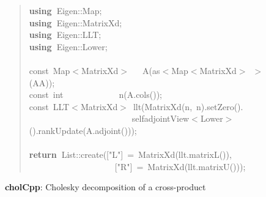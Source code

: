 \documentclass[shortnames,article]{jss}
\newcommand{\hlstd}[1]{\textcolor[rgb]{0,0,0}{#1}}
\newcommand{\hlopt}[1]{\textcolor[rgb]{0,0,0}{#1}}
\newcommand{\hlstr}[1]{\textcolor[rgb]{0.90,0.15,0.15}{#1}}
\newcommand{\hlkwa}[1]{\textcolor[rgb]{0.61,0.13,0.93}{\bf{#1}}}
\newcommand{\hlkwb}[1]{\textcolor[rgb]{0.13,0.54,0.13}{#1}}
\newcommand{\hlkwd}[1]{\textcolor[rgb]{0,0,0}{#1}}
\begin{document}
\begin{figure}[htb]
  \begin{quote}
    \noindent
    \ttfamily
    \hlstd{}\hlkwa{using\ }\hlstd{Eigen}\hlopt{::}\hlstd{Map}\hlopt{;}\hspace*{\fill}\\
    \hlstd{}\hlkwa{using\ }\hlstd{Eigen}\hlopt{::}\hlstd{MatrixXd}\hlopt{;}\hspace*{\fill}\\
    \hlstd{}\hlkwa{using\ }\hlstd{Eigen}\hlopt{::}\hlstd{LLT}\hlopt{;}\hspace*{\fill}\\
    \hlstd{}\hlkwa{using\ }\hlstd{Eigen}\hlopt{::}\hlstd{Lower}\hlopt{;}\hspace*{\fill}\\
    \hlstd{}\hspace*{\fill}\\
    \hlkwb{const\ }\hlstd{Map}\hlopt{$<$}\hlstd{MatrixXd}\hlopt{$>$}\hlstd{\ \ \ }\hlopt{}\hlstd{}\hlkwd{A}\hlstd{}\hlopt{(}\hlstd{as}\hlopt{$<$}\hlstd{Map}\hlopt{$<$}\hlstd{MatrixXd}\hlopt{$>$\ $>$(}\hlstd{AA}\hlopt{));}\hspace*{\fill}\\
    \hlstd{}\hlkwb{const\ int}\hlstd{\ \ \ \ \ \ \ \ \ \ \ \ \ }\hlkwb{}\hlstd{}\hlkwd{n}\hlstd{}\hlopt{(}\hlstd{A}\hlopt{.}\hlstd{}\hlkwd{cols}\hlstd{}\hlopt{());}\hspace*{\fill}\\
    \hlstd{}\hlkwb{const\ }\hlstd{LLT}\hlopt{$<$}\hlstd{MatrixXd}\hlopt{$>$\ }\hlstd{}\hlkwd{llt}\hlstd{}\hlopt{(}\hlstd{}\hlkwd{MatrixXd}\hlstd{}\hlopt{(}\hlstd{n}\hlopt{,\ }\hlstd{n}\hlopt{).}\hlstd{}\hlkwd{setZero}\hlstd{}\hlopt{().}\hspace*{\fill}\\
    \hlstd{}\hlstd{\ \ \ \ \ \ \ \ \ \ \ \ \ \ \ \ \ \ \ \ \ \ \ \ }\hlstd{selfadjointView}\hlopt{$<$}\hlstd{Lower}\hlopt{$>$().}\hlstd{}\hlkwd{rankUpdate}\hlstd{}\hlopt{(}\hlstd{A}\hlopt{.}\hlstd{}\hlkwd{adjoint}\hlstd{}\hlopt{()));}\hspace*{\fill}\\
    \hlstd{}\hspace*{\fill}\\
    \hlkwa{return\ }\hlstd{List}\hlopt{::}\hlstd{}\hlkwd{create}\hlstd{}\hlopt{(}\hlstd{\textunderscore }\hlopt{{[}}\hlstd{}\hlstr{"L"}\hlstd{}\hlopt{{]}\ =\ }\hlstd{}\hlkwd{MatrixXd}\hlstd{}\hlopt{(}\hlstd{llt}\hlopt{.}\hlstd{}\hlkwd{matrixL}\hlstd{}\hlopt{()),}\hspace*{\fill}\\
    \hlstd{}\hlstd{\ \ \ \ \ \ \ \ \ \ \ \ \ \ \ \ \ \ \ \ }\hlstd{\textunderscore }\hlopt{{[}}\hlstd{}\hlstr{"R"}\hlstd{}\hlopt{{]}\ =\ }\hlstd{}\hlkwd{MatrixXd}\hlstd{}\hlopt{(}\hlstd{llt}\hlopt{.}\hlstd{}\hlkwd{matrixU}\hlstd{}\hlopt{()));}\hlstd{}\hspace*{\fill}
    \normalfont
    \normalsize
  \end{quote}
  \caption{\textbf{cholCpp}: Cholesky decomposition of a cross-product}
  \label{chol}
\end{figure}
\end{document}
